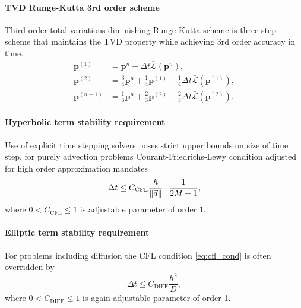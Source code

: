\paragraph{TVD Runge-Kutta 3rd order scheme}
Third order total variations diminishing Runge-Kutta scheme \cite{Gottlieb2002} 
is three step scheme that maintains the TVD property while achieving 3rd order 
accuracy in time.
\begin{equation}    
    \begin{aligned}
        \mathbf{p}^{(1)} &= \mathbf{p}^n - \Delta t  
        \bar{\mathcal{L}}(\mathbf{p}^n), \\
        \mathbf{\mathbf{p}}^{(2)} &= \frac{3}{4}\mathbf{p}^n 
        +\frac{1}{4}\mathbf{p}^{(1)} - \frac{1}{4}\Delta t 
         \bar{\mathcal{L}}(\mathbf{p}^{(1)}),\\
        \mathbf{p}^{(n+1)} &= \frac{1}{3}\mathbf{p}^n 
        +\frac{2}{3}\mathbf{p}^{(2)} - \frac{2}{3}\Delta t 
         \bar{\mathcal{L}}(\mathbf{p}^{(2)}).
    \end{aligned}
\end{equation}


\paragraph{Hyperbolic term stability requirement}
Use of explicit time stepping solvers poses strict upper bounds on size of time step, 
for purely advection problems Courant-Friedrichs-Lewy condition adjusted for high order 
approximation mandates \cite[p. 5]{Chalons2018}
\begin{equation}\label{eq:cfl_cond}
\Delta t \leq C_\mathrm{CFL}\frac{h}{\left\lVert\vec{a}\right\rVert} \cdot \frac{1}{2M + 1},
\end{equation}
where $0 < C_\mathrm{CFL} \leq 1$ is adjustable parameter of order 1.


\paragraph{Elliptic term stability requirement}
For problems including diffusion the CFL condition \eqref{eq:cfl_cond} is often 
overridden by \cite{Hesthaven2008}
\begin{equation}
\Delta t \leq C_\mathrm{DIFF}\frac{h^2}{D}, %
\end{equation} 
where $0 < C_\mathrm{DIFF} \leq 1$ is again adjustable parameter of order 1.

\newpage
